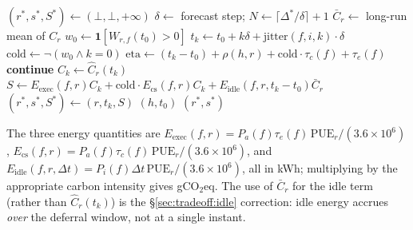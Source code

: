 \begin{algorithm}[t]
\caption{\textsc{ScoreSlots}$(f, h, \mathcal{R}^*, \Delta^*, \hat{C}, \mathcal{S}, t_0)$}
\label{alg:scoreslots}
\begin{algorithmic}[1]
\State $(r^*, s^*, S^*) \gets (\bot, \bot, +\infty)$
  \State $\delta \gets$ forecast step; $N \gets \lceil \Delta^*/\delta \rceil + 1$
  \State $\bar{C}_r \gets$ long-run mean of $C_r$
  \State $w_0 \gets \mathbf{1}[W_{r,f}(t_0) > 0]$
    \State $t_k \gets t_0 + k\delta + \text{jitter}(f, i, k)\cdot\delta$
    \State $\text{cold} \gets \neg(w_0 \wedge k=0)$
    \State $\text{eta} \gets (t_k - t_0) + \rho(h,r) + \text{cold}\cdot\tau_c(f) + \tau_e(f)$
     \textbf{continue}
    \EndIf
    \State $C_k \gets \hat{C}_r(t_k)$
    \State $S \gets E_{\mathrm{exec}}(f,r)C_k + \text{cold}\cdot E_{\mathrm{cs}}(f,r)C_k + E_{\mathrm{idle}}(f,r,t_k-t_0)\bar{C}_r$
     $(r^*, s^*, S^*) \gets (r, t_k, S)$
    \EndIf
  \EndFor
\EndFor
{} \Return $(h, t_0)$
\EndIf
\State \Return $(r^*, s^*)$
\end{algorithmic}
\end{algorithm}

The three energy quantities are
$E_{\mathrm{exec}}(f, r) = P_a(f)\tau_e(f)\,\mathrm{PUE}_r / (3.6 \times 10^6)$,
$E_{\mathrm{cs}}(f, r) = P_a(f)\tau_c(f)\,\mathrm{PUE}_r / (3.6 \times 10^6)$, and
$E_{\mathrm{idle}}(f, r, \Delta t) = P_i(f)\Delta t\,\mathrm{PUE}_r / (3.6 \times 10^6)$,
all in kWh; multiplying by the appropriate carbon intensity gives
gCO$_2$eq. The use of $\bar{C}_r$ for the idle term (rather than
$\hat{C}_r(t_k)$) is the \S\ref{sec:tradeoff:idle} correction: idle
energy accrues \emph{over} the deferral window, not at a single
instant.

